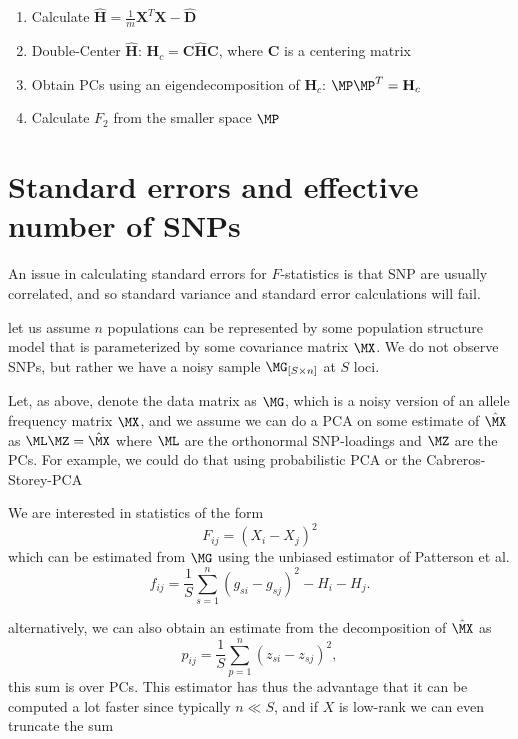 \documentclass[12pt, letterpaper]{article}
\begin{document}
\begin{enumerate}
    \item Calculate $\hat{\mathbf{H}} = \frac{1}{m}\mathbf{X}^T\mathbf{X} - \hat{\mathbf{D}}$
    \item Double-Center $\hat{\mathbf{H}}$: $\mathbf{H}_c = \mathbf{C}\hat{\mathbf{H}}\mathbf{C}$, where $\mathbf{C}$ is a centering matrix
    \item Obtain PCs using an eigendecomposition of $\mathbf{H}_c$: $\MP\MP^T = \mathbf{H}_c$
    \item Calculate $F_2$ from the smaller space $\MP$
\end{enumerate}

\section{Standard errors and effective number of SNPs}
An issue in calculating standard errors for $F$-statistics is that SNP are usually correlated, and so standard variance and standard error calculations will fail.

let us assume $n$ populations can be represented by some population structure model that is parameterized by some covariance matrix $\MX$. We do not observe SNPs, but rather we have a noisy sample $\MG_{[S \times n]}$ at $S$ loci.

Let, as above, denote the data matrix as $\MG$, which is a noisy version of an allele frequency matrix $\MX$, and we assume we can do a PCA on some estimate of $\hat{\MX}$ as 
$\ML\MZ = \hat{\MX}$ where $\ML$ are the orthonormal SNP-loadings and $\MZ$ are the PCs. For example, we could do that using probabilistic PCA or the Cabreros-Storey-PCA

We are interested in statistics of the form 
\begin{equation}
    F_{ij} = (X_i - X_j)^2
\end{equation}
which can be estimated from $\MG$ using the unbiased estimator of Patterson et al.
\begin{equation}
    f_{ij} = \frac{1}{S}\sum_{s=1}^n (g_{si} - g_{sj})^2 - H_i - H_j.
\end{equation}

alternatively, we can also obtain an estimate from the decomposition of  $\hat{\MX}$ as
\begin{equation}
    p_{ij} = \frac{1}{S}\sum_{p=1}^n (z_{si} - z_{sj})^2,
\end{equation}
this sum is over PCs. This estimator has thus the advantage that it can be computed a lot faster since typically $n \ll S$, and if $X$ is low-rank we can even truncate the sum
\end{document}
